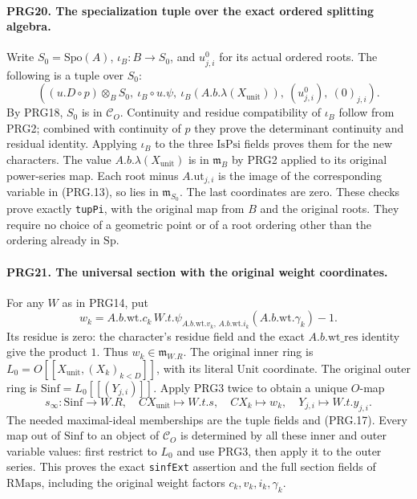 \paragraph{PRG20. The specialization tuple over the exact ordered splitting algebra.}
\label{claim:PRG20}
Write \(S_0=\mathrm{Spo}(A)\), \(\iota_B:B\to S_0\),
and \(u^0_{j,i}\) for its actual ordered roots. The following
is a tuple over \(S_0\):
\[
 \left((u.D\circ p)\otimes_B S_0,\
       \iota_B\circ u.\psi,\
       \iota_B(A.b.\lambda(X_{\mathrm{unit}})),\
       (u^0_{j,i}),\ (0)_{j,i}\right).                    \tag{PRG.16}
\]
By PRG18, \(S_0\) is in \(\mathcal C_O\). Continuity and
residue compatibility of \(\iota_B\) follow from PRG2; combined
with continuity of \(p\) they prove the determinant continuity
and residual identity. Applying \(\iota_B\) to the three
\(\mathrm{IsPsi}\) fields proves them for the new characters.
The value \(A.b.\lambda(X_{\mathrm{unit}})\) is in
\(\mathfrak m_B\) by PRG2 applied to its original power-series
map. Each root minus \(A.\mathrm{ut}_{j,i}\) is the image of
the corresponding variable in (PRG.13), so lies in
\(\mathfrak m_{S_0}\). The last coordinates are zero. These
checks prove exactly \texttt{tupPi}, with the original map from
\(B\) and the original roots. They require no choice of a
geometric point or of a root ordering other than the ordering
already in \(\mathrm{Sp}\).

\paragraph{PRG21. The universal section with the original weight coordinates.}
\label{claim:PRG21}
For any \(W\) as in PRG14, put
\[
 w_k=A.b.\mathrm{wt}.c_k\,
       W.t.\psi_{A.b.\mathrm{wt}.v_k,\,A.b.\mathrm{wt}.i_k}
                    (A.b.\mathrm{wt}.\gamma_k)-1.
 \tag{PRG.17}
\]
Its residue is zero: the character's residue field and the exact
\(A.b.\mathrm{wt\_res}\) identity give the product \(1\).
Thus \(w_k\in\mathfrak m_{W.R}\). The original inner ring is
\(L_0=O[[X_{\mathrm{unit}},(X_k)_{k<D}]]\), with its literal
\(\mathrm{Unit}\) coordinate. The original outer ring is
\(\mathrm{Sinf}=L_0[[(Y_{j,i})]]\). Apply PRG3 twice to obtain
a unique \(O\)-map
\[
 s_\infty:\mathrm{Sinf}\longrightarrow W.R,
 \quad CX_{\mathrm{unit}}\mapsto W.t.s,
 \quad CX_k\mapsto w_k,
 \quad Y_{j,i}\mapsto W.t.y_{j,i}.                         \tag{PRG.18}
\]
The needed maximal-ideal memberships are the tuple fields and
(PRG.17). Every map out of \(\mathrm{Sinf}\) to an object of
\(\mathcal C_O\) is determined by all these inner and outer
variable values: first restrict to \(L_0\) and use PRG3, then
apply it to the outer series. This proves the exact
\texttt{sinfExt} assertion and the full section fields of
\(\mathrm{RMaps}\), including the original weight factors
\(c_k,v_k,i_k,\gamma_k\).

